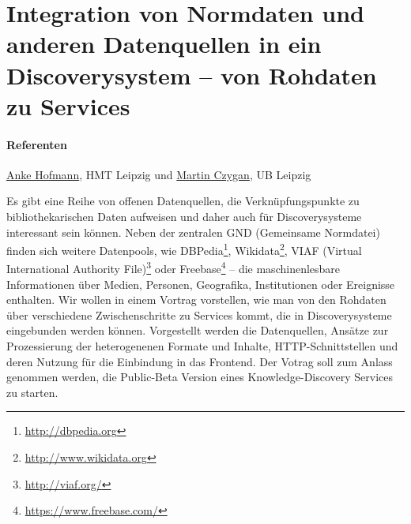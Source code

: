 \documentclass[german]{article}
\author{
Martin Czygan \\
Leipzig University Library \\
Beethovenstra\ss{}e 6 \\
04107 Leipzig \\
martin.czygan@uni-leipzig.de
}
\begin{document}
\thispagestyle{empty}
\section*{Integration von Normdaten und anderen Datenquellen in ein Discoverysystem -- von Rohdaten zu Services}

\paragraph{Referenten}  \href{mailto:anke.hofmann@hmt-leipzig.de}{Anke Hofmann}, HMT Leipzig und \href{mailto:martin.czygan@uni-leipzig.de}{Martin Czygan}, UB Leipzig\\
\vspace{0.2cm}

Es gibt eine Reihe von offenen Datenquellen,
die Verknüpfungspunkte zu bibliothekarischen Daten aufweisen und daher
auch für Discoverysysteme interessant sein können. Neben der
zentralen GND (Gemeinsame Normdatei) finden sich weitere Datenpools,
wie DBPedia\footnote{\url{http://dbpedia.org}}, Wikidata\footnote{\url{http://www.wikidata.org}},
VIAF (Virtual International Authority File)\footnote{\url{http://viaf.org/}}
oder Freebase\footnote{\url{https://www.freebase.com/}} -- die maschinenlesbare
Informationen über Medien, Personen, Geografika, Institutionen oder Ereignisse
enthalten. Wir wollen in einem Vortrag vorstellen, wie man von den
Rohdaten über verschiedene Zwischenschritte zu Services kommt, die in
Discoverysysteme eingebunden werden können. Vorgestellt werden die Datenquellen,
Ansätze zur Prozessierung der heterogenenen Formate und Inhalte,
HTTP-Schnittstellen und deren Nutzung für die Einbindung in das Frontend.
Der Votrag soll zum Anlass genommen werden, die Public-Beta Version
eines Knowledge-Discovery Services zu starten.
\end{document}
